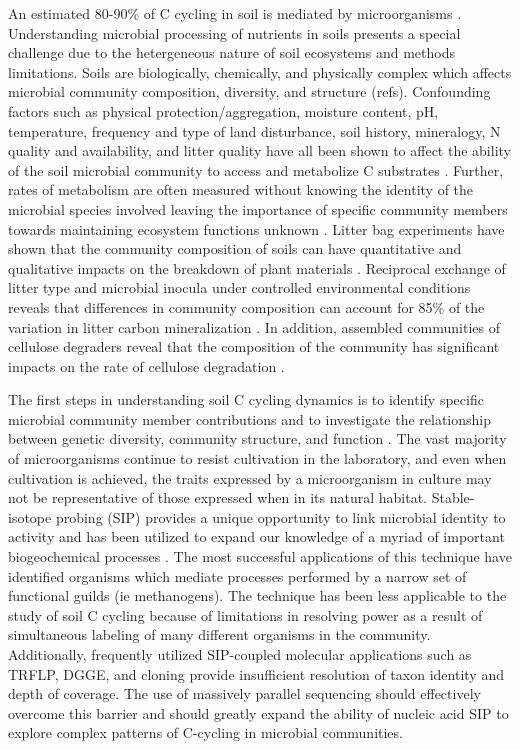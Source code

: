An estimated 80-90\% of C cycling in soil is mediated by microorganisms \cite{ColemanCrossley_1996,Nannipieri_2003}. Understanding microbial processing of nutrients in soils presents a special challenge due to the hetergeneous nature of soil ecosystems and methods limitations. Soils are biologically, chemically, and physically complex which affects microbial community composition, diversity, and structure (refs). Confounding factors such as physical protection/aggregation, moisture content, pH, temperature, frequency and type of land disturbance, soil history, mineralogy, N quality and availability, and litter quality have all been shown to affect the ability of the soil microbial community to access and metabolize C substrates \cite{Schlesinger_1977,dgett_Wall_Hattenschwiler_2010,Sollins_Homann_Caldwell_1996,Torn_Vitousek_Trumbore_2005,TRUMBORE_2006,Schimel_2012}. Further, rates of metabolism are often measured without knowing the identity of the microbial species involved \cite{ndi_Pietramellara_Renella_2003} leaving the importance of specific community members towards maintaining ecosystem functions unknown \cite{Allison_2008,ndi_Pietramellara_Renella_2003,Schimel_2012}. Litter bag experiments have shown that the community composition of soils can have quantitative and qualitative impacts on the breakdown of plant materials \cite{Schimel_1995}. Reciprocal exchange of litter type and microbial inocula under controlled environmental conditions reveals that differences in community composition can account for 85\% of the variation in litter carbon mineralization \cite{Strickland_2009}. In addition, assembled communities of cellulose degraders reveal that the composition of the community has significant impacts on the rate of cellulose degradation \cite{Wohl_2004}. 

The first steps in understanding soil C cycling dynamics is to identify specific microbial community member contributions and to investigate the relationship between genetic diversity, community structure, and function \cite{O_Donnell_2002}. The vast majority of microorganisms continue to resist cultivation in the laboratory, and even when cultivation is achieved, the traits expressed by a microorganism in culture may not be representative of those expressed when in its natural habitat. Stable-isotope probing (SIP) provides a unique opportunity to link microbial identity to activity and has been utilized to expand our knowledge of a myriad of important biogeochemical processes \cite{Chen_Murrell_2010}. The most successful applications of this technique have identified organisms which mediate processes performed by a narrow set of functional guilds (ie methanogens). The technique has been less applicable to the study of soil C cycling because of limitations in resolving power as a result of simultaneous labeling of many different organisms in the community. Additionally, frequently utilized SIP-coupled molecular applications such as TRFLP, DGGE, and cloning provide insufficient resolution of taxon identity and depth of coverage. The use of massively parallel sequencing should effectively overcome this barrier and should greatly expand the ability of nucleic acid SIP to explore complex patterns of C-cycling in microbial communities. 

